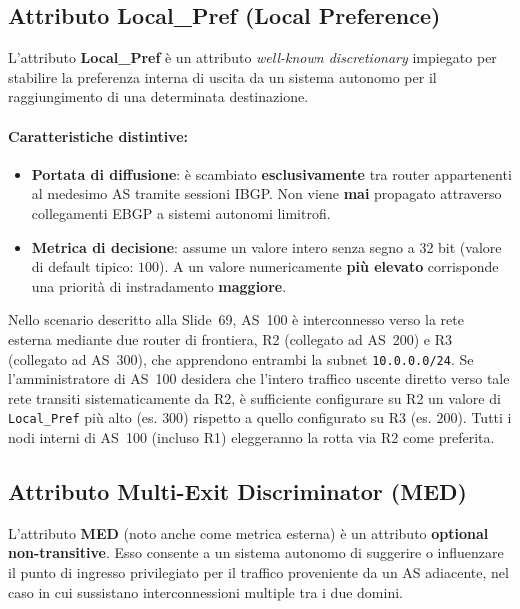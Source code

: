 \documentclass[11pt, a4paper]{article}
\begin{document}
\subsection{Attributo Local\_Pref (Local Preference)}

L'attributo \textbf{Local\_Pref} è un attributo \emph{well-known discretionary} impiegato per stabilire la preferenza interna di uscita da un sistema autonomo per il raggiungimento di una determinata destinazione.


\paragraph{Caratteristiche distintive:}
\begin{itemize}[noitemsep]
    \item \textbf{Portata di diffusione}: è scambiato \textbf{esclusivamente} tra router appartenenti al medesimo AS tramite sessioni IBGP. Non viene \textbf{mai} propagato attraverso collegamenti EBGP a sistemi autonomi limitrofi.
    \item \textbf{Metrica di decisione}: assume un valore intero senza segno a 32 bit (valore di default tipico: $100$). A un valore numericamente \textbf{più elevato} corrisponde una priorità di instradamento \textbf{maggiore}.
\end{itemize}

Nello scenario descritto alla Slide~69, AS~100 è interconnesso verso la rete esterna mediante due router di frontiera, R2 (collegato ad AS~200) e R3 (collegato ad AS~300), che apprendono entrambi la subnet \texttt{10.0.0.0/24}. Se l'amministratore di AS~100 desidera che l'intero traffico uscente diretto verso tale rete transiti sistematicamente da R2, è sufficiente configurare su R2 un valore di \texttt{Local\_Pref} più alto (es. $300$) rispetto a quello configurato su R3 (es. $200$). Tutti i nodi interni di AS~100 (incluso R1) eleggeranno la rotta via R2 come preferita.

\subsection{Attributo Multi-Exit Discriminator (MED)}

L'attributo \textbf{MED} (noto anche come metrica esterna) è un attributo \textbf{optional non-transitive}. Esso consente a un sistema autonomo di suggerire o influenzare il punto di ingresso privilegiato per il traffico proveniente da un AS adiacente, nel caso in cui sussistano interconnessioni multiple tra i due domini.
\end{document}
